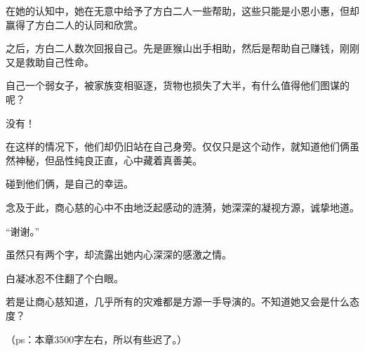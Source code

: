 \begin{this_body}
在她的认知中，她在无意中给予了方白二人一些帮助，这些只能是小恩小惠，但却赢得了方白二人的认同和欣赏。

之后，方白二人数次回报自己。先是匪猴山出手相助，然后是帮助自己赚钱，刚刚又是救助自己性命。

自己一个弱女子，被家族变相驱逐，货物也损失了大半，有什么值得他们图谋的呢？

没有！

在这样的情况下，他们却仍旧站在自己身旁。仅仅只是这个动作，就知道他们俩虽然神秘，但品性纯良正直，心中藏着真善美。

碰到他们俩，是自己的幸运。

念及于此，商心慈的心中不由地泛起感动的涟漪，她深深的凝视方源，诚挚地道。

“谢谢。”

虽然只有两个字，却流露出她内心深深的感激之情。

白凝冰忍不住翻了个白眼。

若是让商心慈知道，几乎所有的灾难都是方源一手导演的。不知道她又会是什么态度？

（ps：本章3500字左右，所以有些迟了。）

\end{this_body}

